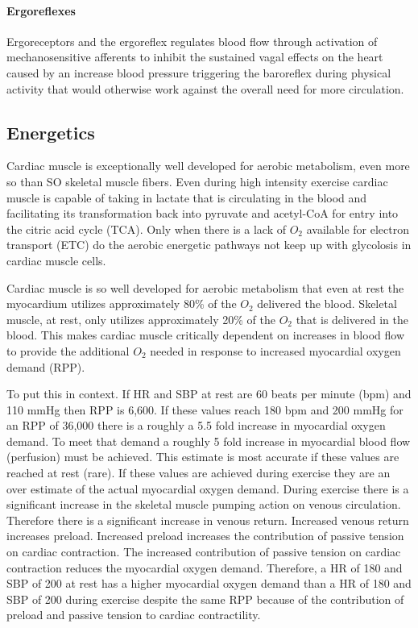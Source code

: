 \paragraph{Ergoreflexes}
Ergoreceptors and the ergoreflex regulates blood flow through activation of mechanosensitive afferents to inhibit the sustained vagal effects on the heart caused by an increase blood pressure triggering the baroreflex during physical activity that would otherwise work against the overall need for more circulation.

\subsection{Energetics}

Cardiac muscle is exceptionally well developed for aerobic metabolism, even more so than SO skeletal muscle fibers. Even during high intensity exercise cardiac muscle is capable of taking in lactate that is circulating in the blood and facilitating its transformation back into pyruvate and acetyl-CoA for entry into the citric acid cycle (TCA). Only when there is a lack of $O_2$ available for electron transport (ETC) do the aerobic energetic pathways not keep up with glycolosis in cardiac muscle cells. 

Cardiac muscle is so well developed for aerobic metabolism that even at rest the myocardium utilizes approximately 80\% of the $O_2$ delivered the blood. Skeletal muscle, at rest, only utilizes approximately 20\% of the $O_2$ that is delivered in the blood. This makes cardiac muscle critically dependent on increases in blood flow to provide the additional $O_2$ needed in response to increased myocardial oxygen demand (RPP).

To put this in context. If HR and SBP at rest are 60 beats per minute (bpm) and 110 mmHg then RPP is 6,600. If these values reach 180 bpm and 200 mmHg for an RPP of 36,000 there is a roughly a 5.5 fold increase in myocardial oxygen demand. To meet that demand a roughly 5 fold increase in myocardial blood flow (perfusion) must be achieved. This estimate is most accurate if these values are reached at rest (rare). If these values are achieved during exercise they are an over estimate of the actual myocardial oxygen demand. During exercise there is a significant increase in the skeletal muscle pumping action on venous circulation. Therefore there is a significant increase in venous return. Increased venous return increases preload. Increased preload increases the contribution of passive tension on cardiac contraction. The increased contribution of passive tension on cardiac contraction reduces the myocardial oxygen demand. 
Therefore, a HR of 180 and SBP of 200 at rest has a higher myocardial oxygen demand than a HR of 180 and SBP of 200 during exercise despite the same RPP because of the contribution of preload and passive tension to cardiac contractility.


